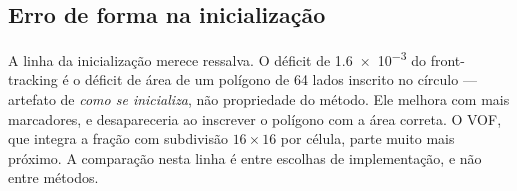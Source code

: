 \begin{center}
\end{center}

\subsection{Erro de forma na inicializa\c{c}\~ao}

A linha da inicializa\c{c}\~ao merece ressalva. O d\'eficit de \num{1.6e-3} do
front-tracking \'e o d\'eficit de \'area de um pol\'igono de 64 lados inscrito no
c\'irculo --- artefato de \emph{como se inicializa}, n\~ao propriedade do
m\'etodo. Ele melhora com mais marcadores, e desapareceria ao inscrever o
pol\'igono com a \'area correta. O VOF, que integra a fra\c{c}\~ao com
subdivis\~ao $16\times16$ por c\'elula, parte muito mais pr\'oximo. A compara\c{c}\~ao
nesta linha \'e entre escolhas de implementa\c{c}\~ao, e n\~ao entre m\'etodos.
